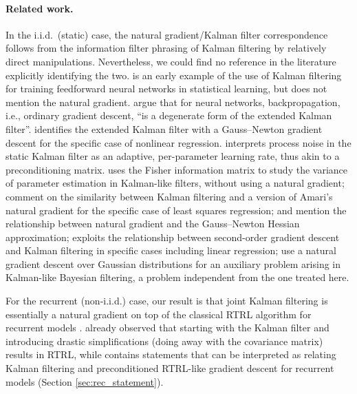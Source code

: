 \documentclass[11pt,a4paper]{article}
\newcommand{\1}{\mathbbm{1}}
\theoremstyle{yannthm}
\theoremstyle{yannthm2}
\numberwithin{equation}{section}
\begin{document}
\paragraph*{Related work.}
In the i.i.d.\ (static) case, the natural gradient/Kalman filter
correspondence follows from the information filter phrasing of Kalman
filtering \cite[\S6.2]{simon2006kalmanbook} by relatively direct
manipulations. Nevertheless, we could find no reference in the literature
explicitly identifying the two.  \cite{singhalwu1988} is an
early example of the use of Kalman filtering for training feedforward
neural networks in statistical learning, but does not mention the natural
gradient. \cite{ruck1992comparative} argue that for neural networks,
backpropagation, i.e., ordinary gradient descent, ``is a degenerate form of the
extended Kalman filter''.
\cite{bertsekas96}
identifies the extended Kalman filter with a Gauss--Newton gradient
descent for the specific case of nonlinear regression.
\cite{freitas2000hierarchical}
interprets process noise in the static Kalman filter as
an adaptive, per-parameter
learning rate, thus akin to a preconditioning matrix.
\cite{simandl2001CramerRao} uses the Fisher information matrix to study
the variance of parameter estimation in Kalman-like filters, without
using a natural gradient; \cite{bottoulecun2003} comment on the similarity between
Kalman filtering and a version of Amari's natural gradient for the specific case of least squares
regression; \cite{martensnatgrad} and \cite{gradnn} mention the
relationship between natural gradient and the Gauss--Newton Hessian
approximation; \cite{patel_kalmansgd} exploits the
relationship between second-order gradient descent and Kalman filtering
in specific cases including linear regression; \cite{li2017information} use a natural
gradient descent over Gaussian distributions for an auxiliary problem arising in Kalman-like Bayesian
filtering, a problem independent from the one treated here.

For the recurrent
(non-i.i.d.) case, our result is that joint Kalman filtering is
essentially a natural gradient on top of the classical RTRL algorithm for
recurrent models \cite{Jaeger_tutorial}. 
\cite{williams1992training} already observed that starting with the Kalman
filter and introducing drastic
simplifications (doing away with the covariance matrix) results in RTRL,
while
\cite[\S5]{Haykin_book} contains statements that can be
interpreted as relating Kalman filtering and preconditioned RTRL-like
gradient descent for recurrent models (Section \ref{sec:rec_statement}).
\end{document}

